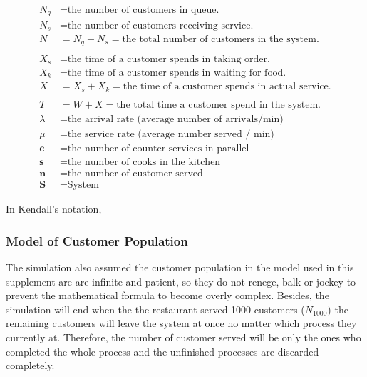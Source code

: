 \begin{align*}
    N_q            & = \text{the number of customers in queue.}                             \\
    N_s            & = \text{the number of customers receiving service.}                    \\
    N              & = N_q +N_s = \text{the total number of customers in the system.}       \\\\
    X_s            & = \text{the time of a customer spends in taking order.}                \\
    X_k            & = \text{the time of a customer spends in waiting for food.}            \\
    X              & = X_s + X_k =  \text{the time of a customer spends in actual service.} \\\\
    T              & = W+X =\text{the total time a customer spend in the system.}           \\
    \lambda        & = \text{the arrival rate (average number of arrivals/min)}             \\
    \mu            & = \text{the service rate (average number served / min)}                \\
    \textbf{c}     & = \text{the number of counter services in parallel}                    \\
    \textbf{s}     & = \text{the number of cooks in the kitchen}                            \\
    \textbf{n}     & = \text{the number of customer served}                                 \\
    \textbf{S} & = \text{System}
\end{align*}

In Kendall's notation,

\subsubsection{Model of Customer Population}
The simulation also assumed the customer population in the model used in this supplement are  are infinite and patient, so they do not renege, balk or jockey to prevent the mathematical formula to become overly complex. Besides, the simulation will end when the the restaurant served 1000 customers ($N_{1000}$) the remaining customers will leave the system at once no matter which process they currently at. Therefore, the number of customer served will be only the ones who completed the whole process and the unfinished processes are discarded completely.
